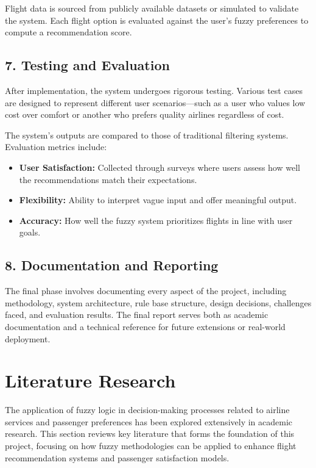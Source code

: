 \documentclass[a4paper]{article}
\begin{document}
Flight data is sourced from publicly available datasets or simulated to validate the system. Each flight option is evaluated against the user’s fuzzy preferences to compute a recommendation score.

\subsection*{7. Testing and Evaluation}

After implementation, the system undergoes rigorous testing. Various test cases are designed to represent different user scenarios—such as a user who values low cost over comfort or another who prefers quality airlines regardless of cost.

The system’s outputs are compared to those of traditional filtering systems. Evaluation metrics include:

\begin{itemize}
    \item \textbf{User Satisfaction:} Collected through surveys where users assess how well the recommendations match their expectations.
    \item \textbf{Flexibility:} Ability to interpret vague input and offer meaningful output.
    \item \textbf{Accuracy:} How well the fuzzy system prioritizes flights in line with user goals.
\end{itemize}

\subsection*{8. Documentation and Reporting}

The final phase involves documenting every aspect of the project, including methodology, system architecture, rule base structure, design decisions, challenges faced, and evaluation results. The final report serves both as academic documentation and a technical reference for future extensions or real-world deployment.



\section*{Literature Research}

The application of fuzzy logic in decision-making processes related to airline services and passenger preferences has been explored extensively in academic research. This section reviews key literature that forms the foundation of this project, focusing on how fuzzy methodologies can be applied to enhance flight recommendation systems and passenger satisfaction models.
\end{document}
